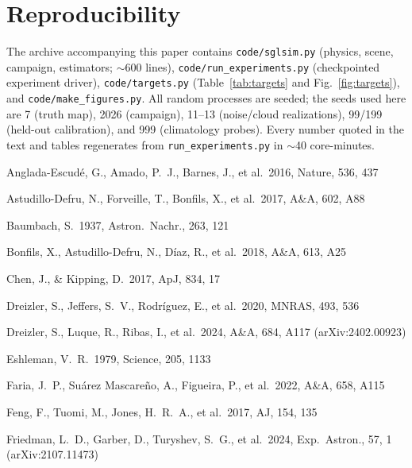 ﻿\documentclass[twocolumn,10pt]{article}
\begin{document}
\section{Reproducibility}
\label{app:repro}
The archive accompanying this paper contains \texttt{code/sglsim.py}
(physics, scene, campaign, estimators; $\sim$600 lines),
\texttt{code/run\_experiments.py} (checkpointed experiment driver),
\texttt{code/targets.py} (Table~\ref{tab:targets} and
Fig.~\ref{fig:targets}), and \texttt{code/make\_figures.py}. All random
processes are seeded; the seeds used here are 7 (truth map), 2026
(campaign), 11--13 (noise/cloud realizations), 99/199 (held-out
calibration), and 999 (climatology probes). Every number quoted in the
text and tables regenerates from
\texttt{run\_experiments.py} in $\sim$40 core-minutes.

\begin{thebibliography}{}

Anglada-Escud\'e, G., Amado, P.~J., Barnes, J., et al.\ 2016, Nature,
536, 437

Astudillo-Defru, N., Forveille, T., Bonfils, X., et al.\ 2017, A\&A,
602, A88

Baumbach, S.\ 1937, Astron.\ Nachr., 263, 121

Bonfils, X., Astudillo-Defru, N., D\'iaz, R., et al.\ 2018, A\&A, 613,
A25

Chen, J., \& Kipping, D.\ 2017, ApJ, 834, 17

Dreizler, S., Jeffers, S.~V., Rodr\'iguez, E., et al.\ 2020, MNRAS,
493, 536

Dreizler, S., Luque, R., Ribas, I., et al.\ 2024, A\&A, 684, A117
(arXiv:2402.00923)

Eshleman, V.~R.\ 1979, Science, 205, 1133

Faria, J.~P., Su\'arez Mascare\~no, A., Figueira, P., et al.\ 2022,
A\&A, 658, A115

Feng, F., Tuomi, M., Jones, H.~R.~A., et al.\ 2017, AJ, 154, 135

Friedman, L.~D., Garber, D., Turyshev, S.~G., et al.\ 2024, Exp.\
Astron., 57, 1 (arXiv:2107.11473)


\end{thebibliography}
\end{document}
